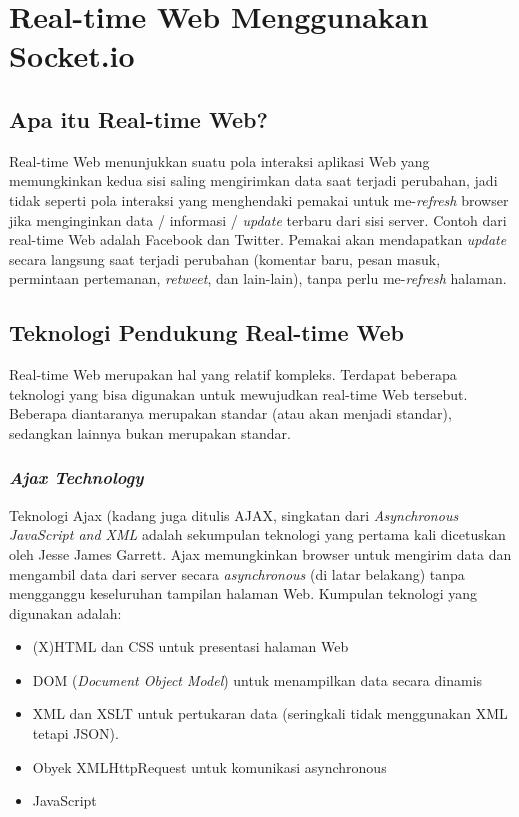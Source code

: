 \chapter{Real-time Web Menggunakan Socket.io}

\section{Apa itu Real-time Web?}

Real-time Web menunjukkan suatu pola interaksi aplikasi Web yang memungkinkan kedua sisi saling mengirimkan data saat terjadi perubahan, jadi tidak seperti pola interaksi yang menghendaki pemakai untuk me-\textit{refresh} browser jika menginginkan data / informasi / \textit{update} terbaru dari sisi server. Contoh dari real-time Web adalah Facebook dan Twitter. Pemakai akan mendapatkan \textit{update} secara langsung saat terjadi perubahan (komentar baru, pesan masuk, permintaan pertemanan, \textit{retweet}, dan lain-lain), tanpa perlu me-\textit{refresh} halaman.

\section{Teknologi Pendukung Real-time Web}

Real-time Web merupakan hal yang relatif kompleks. Terdapat beberapa teknologi yang bisa digunakan untuk mewujudkan real-time Web tersebut. Beberapa diantaranya merupakan standar (atau akan menjadi standar), sedangkan lainnya bukan merupakan standar. 

\subsection{\textit{Ajax Technology}}

Teknologi Ajax (kadang juga ditulis AJAX, singkatan dari \textit{Asynchronous JavaScript and XML} adalah sekumpulan teknologi yang pertama kali dicetuskan oleh Jesse James Garrett. Ajax memungkinkan browser untuk mengirim data dan mengambil data dari server secara \textit{asynchronous} (di latar belakang) tanpa mengganggu keseluruhan tampilan halaman Web. Kumpulan teknologi yang digunakan adalah:
\begin{itemize}
	\item (X)HTML dan CSS untuk presentasi halaman Web
	\item DOM (\textit{Document Object Model}) untuk menampilkan data secara dinamis
	\item XML dan XSLT untuk pertukaran data (seringkali tidak menggunakan XML tetapi JSON).
	\item Obyek XMLHttpRequest untuk komunikasi asynchronous
	\item JavaScript
\end{itemize}

